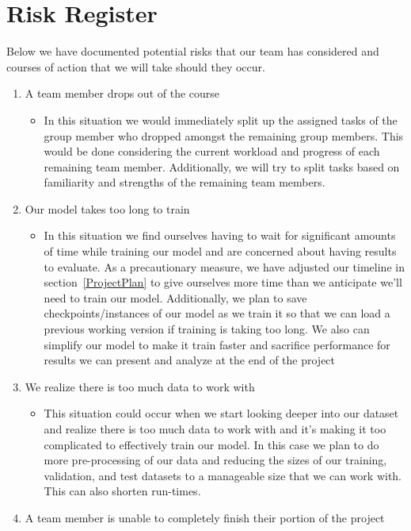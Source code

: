 \documentclass{article} %
\begin{document}
\section{Risk Register}
Below we have documented potential risks that our team has considered and courses of action that we will take should they occur.

\begin{enumerate}
\item A team member drops out of the course\begin{itemize}
\item In this situation we would immediately split up the assigned tasks of the group member who dropped amongst the remaining group members. This would be done considering the current workload and progress of each remaining team member. Additionally, we will try to split tasks based on familiarity and strengths of the remaining team members.
\end{itemize}
\item Our model takes too long to train \begin{itemize}
\item In this situation we find ourselves having to wait for significant amounts of time while training our model and are concerned about having results to evaluate. As a precautionary measure, we have adjusted our timeline in section~\ref{ProjectPlan} to give ourselves more time than we anticipate we'll need to train our model. Additionally, we plan to save checkpoints/instances of our model as we train it so that we can load a previous working version if training is taking too long. We also can simplify our model to make it train faster and sacrifice performance for results we can present and analyze at the end of the project
\end{itemize}
\item We realize there is too much data to work with \begin{itemize}
\item This situation could occur when we start looking deeper into our dataset and realize there is too much data to work with and it's making it too complicated to effectively train our model. In this case we plan to do more pre-processing of our data and reducing the sizes of our training, validation, and test datasets to a manageable size that we can work with. This can also shorten run-times.
\end{itemize}
\item A team member is unable to completely finish their portion of the project \begin{itemize}

\end{itemize}
\end{enumerate}
\end{document}
